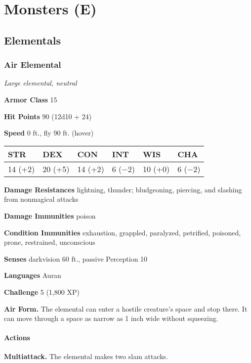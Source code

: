 \documentclass[
]{article}
\date{}
\begin{document}
\hypertarget{monsters-e}{%
\section{Monsters (E)}\label{monsters-e}}

\hypertarget{elementals}{%
\subsection{Elementals}\label{elementals}}

\hypertarget{air-elemental}{%
\subsubsection{Air Elemental}\label{air-elemental}}

\emph{Large elemental, neutral}

\textbf{Armor Class} 15

\textbf{Hit Points} 90 (12d10 + 24)

\textbf{Speed} 0 ft., fly 90 ft. (hover)

\begin{longtable}[]{@{}llllll@{}}
\toprule
STR & DEX & CON & INT & WIS & CHA\tabularnewline
\midrule
\endhead
14 (+2) & 20 (+5) & 14 (+2) & 6 (−2) & 10 (+0) & 6 (−2)\tabularnewline
\bottomrule
\end{longtable}

\textbf{Damage Resistances} lightning, thunder; bludgeoning, piercing,
and slashing from nonmagical attacks

\textbf{Damage Immunities} poison

\textbf{Condition Immunities} exhaustion, grappled, paralyzed,
petrified, poisoned, prone, restrained, unconscious

\textbf{Senses} darkvision 60 ft., passive Perception 10

\textbf{Languages} Auran

\textbf{Challenge} 5 (1,800 XP)

\textbf{Air Form.} The elemental can enter a hostile creature's space
and stop there. It can move through a space as narrow as 1 inch wide
without squeezing.

\hypertarget{actions}{%
\paragraph{Actions}\label{actions}}

\textbf{Multiattack.} The elemental makes two slam attacks.
\end{document}
